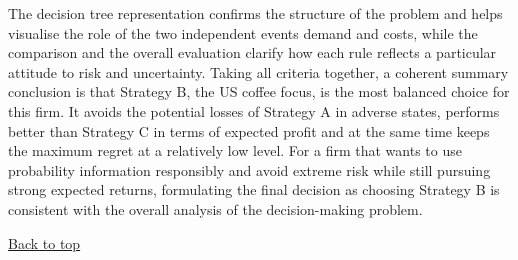 \documentclass[11pt]{article}
\begin{document}
	\medskip
	The decision tree representation confirms the structure of the problem and helps visualise the role of the two independent events demand and costs, while the comparison and the overall evaluation clarify how each rule reflects a particular attitude to risk and uncertainty. Taking all criteria together, a coherent summary conclusion is that Strategy B, the US coffee focus, is the most balanced choice for this firm. It avoids the potential losses of Strategy A in adverse states, performs better than Strategy C in terms of expected profit and at the same time keeps the maximum regret at a relatively low level. For a firm that wants to use probability information responsibly and avoid extreme risk while still pursuing strong expected returns, formulating the final decision as choosing Strategy B is consistent with the overall analysis of the decision-making problem.
	
	\medskip
	\noindent\hyperref[sec:example2]{Back to top}
	
\end{document}
